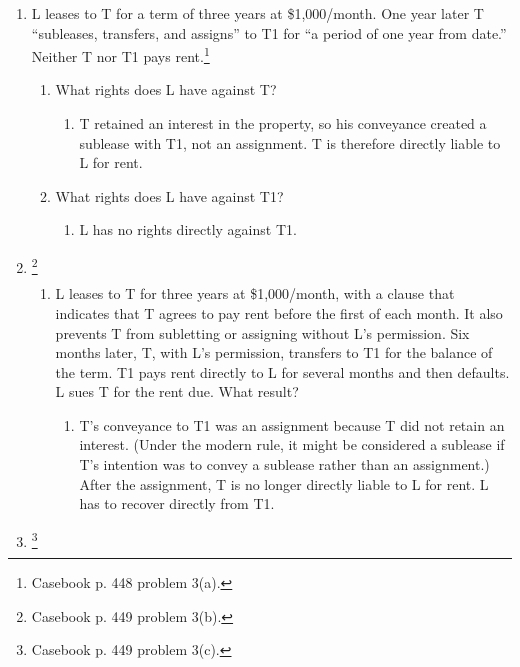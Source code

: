 \begin{enumerate}
    \item L leases to T for a term of three years at \$1,000/month. One year 
    later T ``subleases, transfers, and assigns'' to T1 for ``a period of one 
    year from date.'' Neither T nor T1 pays rent.\footnote{Casebook p. 448 
    problem 3(a).}
    \begin{enumerate}
        \item What rights does L have against T?
        \begin{enumerate}
            \item T retained an interest in the property, so his conveyance 
            created a sublease with T1, not an assignment. T is therefore 
            directly liable to L for rent.
        \end{enumerate}
        \item What rights does L have against T1?
        \begin{enumerate}
            \item L has no rights directly against T1.
        \end{enumerate}
    \end{enumerate}
    \item \footnote{Casebook p. 449 problem 3(b).} %
    \begin{enumerate}
        \item L leases to T for three years at \$1,000/month, with a clause 
        that indicates that T agrees to pay rent before the first of each 
        month. It also prevents T from subletting or assigning without L's 
        permission. Six months later, T, with L's permission, transfers to T1 
        for the balance of the term. T1 pays rent directly to L for several 
        months and then defaults. L sues T for the rent due. What result?
        \begin{enumerate}
            \item T's conveyance to T1 was an assignment because T did not 
            retain an interest. (Under the modern rule, it might be considered 
            a sublease if T's intention was to convey a sublease rather than 
            an assignment.) After the assignment, T is no longer directly 
            liable to L for rent. L has to recover directly from T1.
        \end{enumerate}
    \end{enumerate}
    \item \footnote{Casebook p. 449 problem 3(c).}
    \begin{enumerate}

\end{enumerate}
\end{enumerate}
